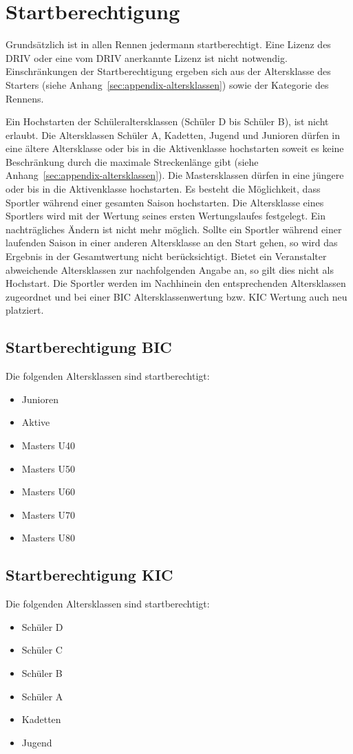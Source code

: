 \section{Startberechtigung}
Grundsätzlich ist in allen Rennen jedermann startberechtigt. Eine Lizenz des DRIV oder eine vom DRIV anerkannte Lizenz ist nicht notwendig. Einschränkungen der Startberechtigung ergeben sich aus der Altersklasse des Starters (siehe Anhang~\ref{sec:appendix-altersklassen}) sowie der Kategorie des Rennens.

Ein Hochstarten der Schüleraltersklassen (Schüler D bis Schüler B), ist nicht erlaubt. Die Altersklassen Schüler A, Kadetten, Jugend und Junioren dürfen in eine ältere Altersklasse oder bis in die Aktivenklasse hochstarten soweit es keine Beschränkung durch die maximale Streckenlänge gibt (siehe Anhang~\ref{sec:appendix-altersklassen}). Die Mastersklassen dürfen in eine jüngere oder bis in die Aktivenklasse hochstarten.
Es besteht die Möglichkeit, dass Sportler während einer gesamten Saison hochstarten. Die Altersklasse eines Sportlers wird mit der Wertung seines ersten Wertungslaufes festgelegt. Ein nachträgliches Ändern ist nicht mehr möglich. Sollte ein Sportler während einer laufenden Saison in einer anderen Altersklasse an den Start gehen, so wird das Ergebnis in der Gesamtwertung nicht berücksichtigt. Bietet ein Veranstalter abweichende Altersklassen zur nachfolgenden Angabe an, so gilt dies nicht als Hochstart. Die Sportler werden im Nachhinein den entsprechenden Altersklassen zugeordnet und bei einer BIC Altersklassenwertung bzw. KIC Wertung auch neu platziert.

\subsection{Startberechtigung BIC}
Die folgenden Altersklassen sind startberechtigt:
\begin{itemize}
	\item Junioren
	\item Aktive
	\item Masters U40
	\item Masters U50
	\item Masters U60
	\item Masters U70
	\item Masters U80
\end{itemize}

\subsection{Startberechtigung KIC}
Die folgenden Altersklassen sind startberechtigt:
\begin{itemize}
	\item Schüler D
	\item Schüler C
	\item Schüler B
	\item Schüler A
	\item Kadetten
	\item Jugend
\end{itemize}

